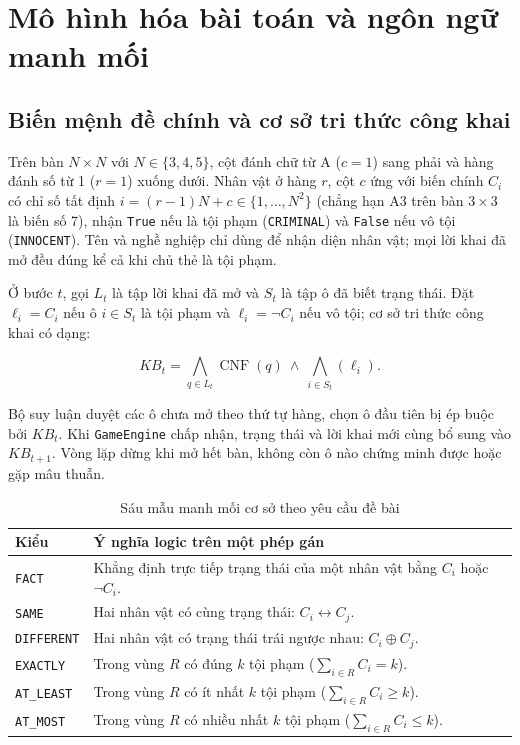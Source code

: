 \section{Mô hình hóa bài toán và ngôn ngữ manh mối}

\subsection{Biến mệnh đề chính và cơ sở tri thức công khai}

Trên bàn $N\times N$ với $N\in\{3,4,5\}$, cột đánh chữ từ A ($c=1$) sang phải và hàng đánh số từ 1 ($r=1$) xuống dưới. Nhân vật ở hàng $r$, cột $c$ ứng với biến chính $C_i$ có chỉ số tất định $i=(r-1)N+c\in\{1,\ldots,N^2\}$ (chẳng hạn A3 trên bàn $3\times3$ là biến số 7), nhận \texttt{True} nếu là tội phạm (\texttt{CRIMINAL}) và \texttt{False} nếu vô tội (\texttt{INNOCENT}). Tên và nghề nghiệp chỉ dùng để nhận diện nhân vật; mọi lời khai đã mở đều đúng kể cả khi chủ thẻ là tội phạm.

Ở bước $t$, gọi $L_t$ là tập lời khai đã mở và $S_t$ là tập ô đã biết trạng thái. Đặt $\ell_i=C_i$ nếu ô $i\in S_t$ là tội phạm và $\ell_i=\neg C_i$ nếu vô tội; cơ sở tri thức công khai có dạng:

\[
KB_t=\bigwedge_{q\in L_t}\operatorname{CNF}(q)\ \land\ \bigwedge_{i\in S_t}(\ell_i).
\]

Bộ suy luận duyệt các ô chưa mở theo thứ tự hàng, chọn ô đầu tiên bị ép buộc bởi $KB_t$. Khi \texttt{GameEngine} chấp nhận, trạng thái và lời khai mới cùng bổ sung vào $KB_{t+1}$. Vòng lặp dừng khi mở hết bàn, không còn ô nào chứng minh được hoặc gặp mâu thuẫn.

\begin{table}[H]
\centering\small\singlespacing
\caption{Sáu mẫu manh mối cơ sở theo yêu cầu đề bài}
\smallskip
\renewcommand{\arraystretch}{1.23}
\begin{tabularx}{\linewidth}{@{}l >{\raggedright\arraybackslash}X@{}}
\toprule
\textbf{Kiểu} & \textbf{Ý nghĩa logic trên một phép gán} \\
\midrule
\texttt{FACT} & Khẳng định trực tiếp trạng thái của một nhân vật bằng $C_i$ hoặc $\neg C_i$. \\
\texttt{SAME} & Hai nhân vật có cùng trạng thái: $C_i\leftrightarrow C_j$. \\
\texttt{DIFFERENT} & Hai nhân vật có trạng thái trái ngược nhau: $C_i\oplus C_j$. \\
\texttt{EXACTLY} & Trong vùng $R$ có đúng $k$ tội phạm ($\sum_{i\in R} C_i = k$). \\
\texttt{AT\_LEAST} & Trong vùng $R$ có ít nhất $k$ tội phạm ($\sum_{i\in R} C_i \ge k$). \\
\texttt{AT\_MOST} & Trong vùng $R$ có nhiều nhất $k$ tội phạm ($\sum_{i\in R} C_i \le k$). \\
\bottomrule
\end{tabularx}
\end{table}


